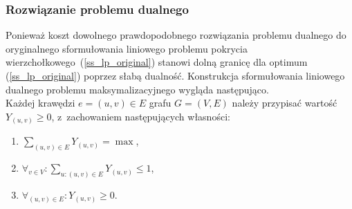 \subsubsection{\textbf{Rozwiązanie problemu dualnego}}
\par{
  Ponieważ koszt dowolnego prawdopodobnego rozwiązania problemu
  dualnego do oryginalnego sformułowania liniowego problemu pokrycia
  wierzchołkowego~(\ref{ss_lp_original}) stanowi dolną granicę dla optimum
  (\ref{ss_lp_original}) poprzez słabą dualność. 
  Konstrukcja sformułowania liniowego dualnego problemu maksymalizacyjnego wygląda
  następująco.\\
  Każdej krawędzi $e=(u,v) \in E$ grafu $G=(V,E)$ należy przypisać wartość
  $Y_{(u,v)} \geq 0$, z~zachowaniem następujących własności:
  \begin{enumerate}
    \item $\sum_{(u,v) \in E}Y_{(u,v)} = \max$,
    \item $\forall_{v \in V}:\sum_{u:(u,v)\in E}Y_{(u,v)} \leq 1$,
    \item $\forall_{(u,v) \in E}: Y_{(u,v)} \geq 0$.
  \end{enumerate}
}